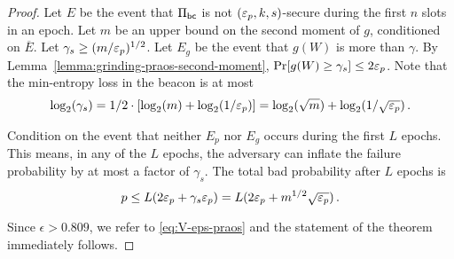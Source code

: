 \begin{proof}
  Let $E$ be the event that 
  $\Pi_\mathsf{bc}$ is not $(\mathsf{\varepsilon}_p, k, s)$-secure during 
  the first $n$ slots in an epoch. 
  Let $m$ be an upper bound on the second moment of $g$, 
  conditioned on $\overline{E}$. 
  Let $\gamma_s \geq (m/\mathsf{\varepsilon}_p)^{1/2}$. 
  Let $E_g$ be the event that $g(W)$ is more than $\gamma$.
  By Lemma~\ref{lemma:grinding-praos-second-moment}, 
  $\Pr[g(W) \geq \gamma_s] \leq 2 \mathsf{\varepsilon}_p$. 
  Note that the min-entropy loss in the beacon is at most 
  \begin{equation}\label{eq:log-gamma}
   \log_2(\gamma_s) 
   = 1/2 \cdot [\log_2(m) + \log_2(1/\mathsf{\varepsilon}_p)]
   = \log_2(\sqrt{m}) + \log_2(1/\sqrt{\mathsf{\varepsilon}_p})
   \,. 
  \end{equation}


  Condition on the event that neither $E_p$ nor $E_g$ 
  occurs during the first $L$ epochs. 
  This means, in any of the $L$ epochs, 
  the adversary can inflate the failure probability 
  by at most a factor of $\gamma_s$.
  The total bad probability after $L$ epochs is
  $$
    p
    \leq L (2 \mathsf{\varepsilon}_p + \gamma_s \mathsf{\varepsilon}_p)
    = L (2 \mathsf{\varepsilon}_p + m^{1/2} \sqrt{\mathsf{\varepsilon}_p})
    \,.
  $$

  Since $\epsilon > 0.809$, we refer to \eqref{eq:V-eps-praos} 
  and the statement of the theorem immediately follows.
\end{proof}

%   














